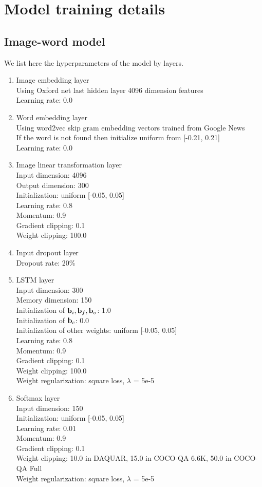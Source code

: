 \chapter{Model training details}
\section{Image-word model}
\label{sec:imgword}
We list here the hyperparameters of the model by layers.
\begin{enumerate}
\item Image embedding layer\\
Using Oxford net \cite{simonyan14} last hidden layer 4096 dimension features\\
Learning rate: 0.0
\item Word embedding layer\\
Using word2vec skip gram embedding vectors trained from Google News \cite{mikolov13}\\
If the word is not found then initialize uniform from [-0.21, 0.21]\\
Learning rate: 0.0
\item Image linear transformation layer\\
Input dimension: 4096\\
Output dimension: 300\\
Initialization: uniform [-0.05, 0.05]\\
Learning rate: 0.8\\
Momentum: 0.9\\
Gradient clipping: 0.1\\
Weight clipping: 100.0
\item Input dropout layer\\
Dropout rate: 20\%
\item LSTM layer\\
Input dimension: 300\\
Memory dimension: 150\\
Initialization of $\mathbf{b}_i, \mathbf{b}_f, \mathbf{b}_o$: 1.0\\
Initialization of $\mathbf{b}_c$: 0.0\\
Initialization of other weights: uniform [-0.05, 0.05]\\
Learning rate: 0.8\\
Momentum: 0.9\\
Gradient clipping: 0.1\\
Weight clipping: 100.0\\
Weight regularization: square loss, $\lambda$ = 5e-5
\item Softmax layer\\
Input dimension: 150\\
Initialization: uniform [-0.05, 0.05]\\
Learning rate: 0.01\\
Momentum: 0.9\\
Gradient clipping: 0.1\\
Weight clipping: 10.0 in DAQUAR, 15.0 in COCO-QA 6.6K, 50.0 in COCO-QA Full\\
Weight regularization: square loss, $\lambda$ = 5e-5
\end{enumerate}

